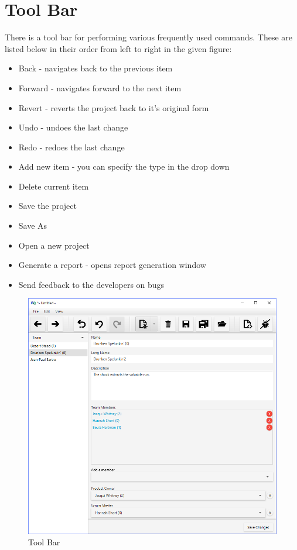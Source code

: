 \section{Tool Bar}

There is a tool bar for performing various frequently used commands. These are listed below in their order from left to right in the given figure:

\begin{itemize}
\item Back - navigates back to the previous item
\item Forward - navigates forward to the next item
\item Revert - reverts the project back to it's original form
\item Undo - undoes the last change
\item Redo - redoes the last change
\item Add new item - you can specify the type in the drop down
\item Delete current item
\item Save the project
\item Save As
\item Open a new project
\item Generate a report - opens report generation window
\item Send feedback to the developers on bugs
\end{itemize}

\begin{figure}[H]
\centering
\includegraphics[width=\textwidth]{images/screenshots/toolbar.PNG}
\caption{Tool Bar}
\label{fig:new_project}
\end{figure}

